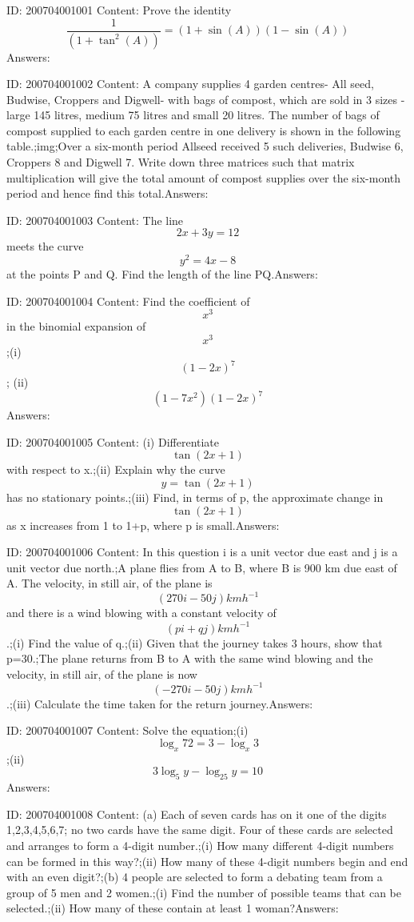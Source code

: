 \documentclass{article}
\begin{document}
ID: 200704001001
Content:
Prove the identity $$\frac{1}{(1+\tan ^2(A))}=(1+\sin (A))(1-\sin (A))$$Answers:

ID: 200704001002
Content:
A company supplies 4 garden centres- All seed, Budwise, Croppers and Digwell- with bags of compost, which are sold in 3 sizes -large 145 litres, medium 75 litres and small 20 litres. The number of bags of compost supplied to each garden centre in one delivery is shown in the following table.;img;Over a six-month period Allseed received 5 such deliveries, Budwise 6, Croppers 8 and Digwell 7. Write down three matrices such that matrix multiplication will give the total amount of compost supplies over the six-month period and hence find this total.Answers:

ID: 200704001003
Content:
The line $$2x+3y=12$$ meets the curve $$y^2=4x-8$$ at the points P and Q. Find the length of the line PQ.Answers:

ID: 200704001004
Content:
Find the coefficient of $$x^3$$ in the binomial expansion of $$x^3$$;(i) $$(1-2x)^7$$ ; (ii) $$(1-7x^2)(1-2x)^7$$Answers:

ID: 200704001005
Content:
(i) Differentiate $$\tan (2x+1)$$ with respect to x.;(ii) Explain why the curve $$y=\tan (2x+1)$$ has no stationary points.;(iii) Find, in terms of p, the approximate change in $$\tan (2x+1)$$ as x increases from 1 to 1+p, where p is small.Answers:

ID: 200704001006
Content:
In this question i is a unit vector due east and j is a unit vector due north.;A plane flies from A to B, where B is 900 km due east of A. The velocity, in still air, of the plane is $$(270i-50j) kmh^{-1}$$ and there is a wind blowing with a constant velocity of $$(pi+qj) kmh^{-1}$$.;(i) Find the value of q.;(ii) Given that the journey takes 3 hours, show that p=30.;The plane returns from B to A with the same wind blowing and the velocity, in still air, of the plane is now $$(-270i-50j) kmh^{-1}$$.;(iii) Calculate the time taken for the return journey.Answers:

ID: 200704001007
Content:
Solve the equation;(i) $$\log_x 72=3-\log_x 3$$;(ii) $$3 \log_5y-\log_25y=10$$Answers:

ID: 200704001008
Content:
(a)	Each of seven cards has on it one of the digits 1,2,3,4,5,6,7; no two cards have the same digit. Four of these cards are selected and arranges to form a 4-digit number.;(i)	How many different 4-digit numbers can be formed in this way?;(ii)	How many of these 4-digit numbers begin and end with an even digit?;(b)	4 people are selected to form a debating team from a group of 5 men and 2 women.;(i)	Find the number of possible teams that can be selected.;(ii)	How many of these contain at least 1 woman?Answers:
\end{document}
